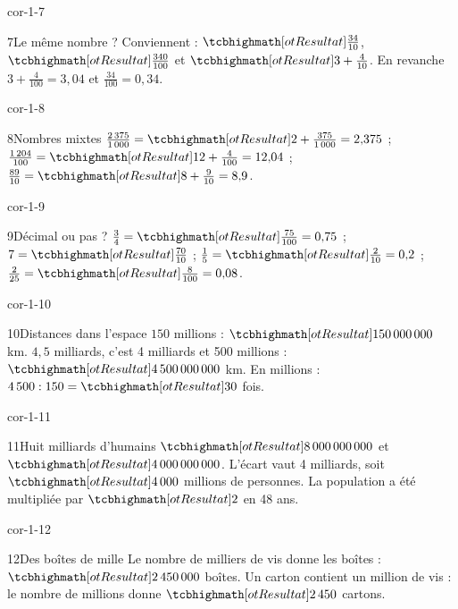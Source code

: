 \begin{blocLivre}{cor-1-7}\begin{corrige}{7}{Le même nombre ?}
Conviennent : $\res{\frac{34}{10}}$, $\res{\frac{340}{100}}$ et $\res{3+\frac4{10}}$. En revanche $3+\frac4{100}=3{,}04$ et $\frac{34}{100}=0{,}34$.
\end{corrige}\end{blocLivre}
\begin{blocLivre}{cor-1-8}\begin{corrige}{8}{Nombres mixtes}
$\frac{2\,375}{1\,000}=\res{2+\frac{375}{1\,000}}=2{,}375$ ; $\frac{1\,204}{100}=\res{12+\frac4{100}}=12{,}04$ ; $\frac{89}{10}=\res{8+\frac9{10}}=8{,}9$.
\end{corrige}\end{blocLivre}
\begin{blocLivre}{cor-1-9}\begin{corrige}{9}{Décimal ou pas ?}
$\frac34=\res{\frac{75}{100}}=0{,}75$ ; $7=\res{\frac{70}{10}}$ ; $\frac15=\res{\frac2{10}}=0{,}2$ ; $\frac2{25}=\res{\frac8{100}}=0{,}08$.
\end{corrige}\end{blocLivre}
\begin{blocLivre}{cor-1-10}\begin{corrige}{10}{Distances dans l’espace}
$150$ millions : $\res{150\,000\,000}$ km. $4{,}5$ milliards, c’est 4 milliards et 500 millions : $\res{4\,500\,000\,000}$ km. En millions : $4\,500:150=\res{30}$ fois.
\end{corrige}\end{blocLivre}
\begin{blocLivre}{cor-1-11}\begin{corrige}{11}{Huit milliards d’humains}
$\res{8\,000\,000\,000}$ et $\res{4\,000\,000\,000}$. L’écart vaut 4 milliards, soit $\res{4\,000}$ millions de personnes. La population a été multipliée par $\res2$ en 48 ans.
\end{corrige}\end{blocLivre}
\begin{blocLivre}{cor-1-12}\begin{corrige}{12}{Des boîtes de mille}
Le nombre de milliers de vis donne les boîtes : $\res{2\,450\,000}$ boîtes. Un carton contient un million de vis : le nombre de millions donne $\res{2\,450}$ cartons.
\end{corrige}\end{blocLivre}
